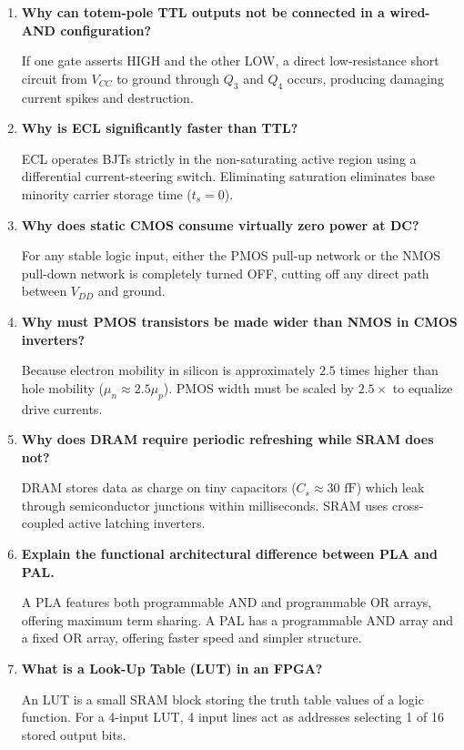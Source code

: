 \documentclass[12pt,a4paper]{article}
\newcommand{\Q}[1]{\textbf{#1}\par\noindent\ignorespaces}
\begin{document}
\begin{tcolorbox}[exambox, title={\textbf{Frequently Asked / Viva Questions}}]
\begin{enumerate}[topsep=0pt, label=\textbf{Q\arabic*.}, itemsep=5pt]
  \item \Q{Why can totem-pole TTL outputs not be connected in a wired-AND configuration?}
  If one gate asserts HIGH and the other LOW, a direct low-resistance short circuit from $V_{CC}$ to ground through $Q_3$ and $Q_4$ occurs, producing damaging current spikes and destruction.

  \item \Q{Why is ECL significantly faster than TTL?}
  ECL operates BJTs strictly in the non-saturating active region using a differential current-steering switch. Eliminating saturation eliminates base minority carrier storage time ($t_s = 0$).

  \item \Q{Why does static CMOS consume virtually zero power at DC?}
  For any stable logic input, either the PMOS pull-up network or the NMOS pull-down network is completely turned OFF, cutting off any direct path between $V_{DD}$ and ground.

  \item \Q{Why must PMOS transistors be made wider than NMOS in CMOS inverters?}
  Because electron mobility in silicon is approximately $2.5$ times higher than hole mobility ($\mu_n \approx 2.5 \mu_p$). PMOS width must be scaled by $2.5\times$ to equalize drive currents.

  \item \Q{Why does DRAM require periodic refreshing while SRAM does not?}
  DRAM stores data as charge on tiny capacitors ($C_s \approx 30\text{ fF}$) which leak through semiconductor junctions within milliseconds. SRAM uses cross-coupled active latching inverters.

  \item \Q{Explain the functional architectural difference between PLA and PAL.}
  A PLA features both programmable AND and programmable OR arrays, offering maximum term sharing. A PAL has a programmable AND array and a fixed OR array, offering faster speed and simpler structure.

  \item \Q{What is a Look-Up Table (LUT) in an FPGA?}
  An LUT is a small SRAM block storing the truth table values of a logic function. For a 4-input LUT, 4 input lines act as addresses selecting 1 of 16 stored output bits.


\end{enumerate}
\end{tcolorbox}
\end{document}
